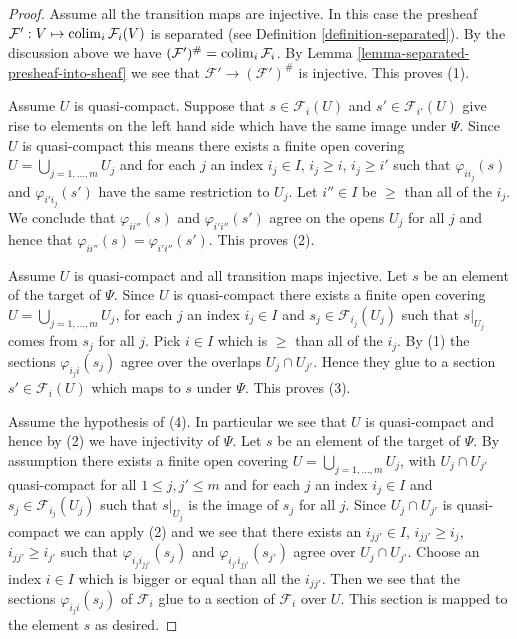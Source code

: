 \begin{proof}
Assume all the transition maps are injective. In this case the presheaf
$\mathcal{F}' : V \mapsto \mathop{\mathrm{colim}}\nolimits_i \mathcal{F}_i(V)$ is
separated (see Definition \ref{definition-separated}).
By the discussion above we have
$(\mathcal{F}')^\# = \mathop{\mathrm{colim}}\nolimits_i \mathcal{F}_i$.
By Lemma \ref{lemma-separated-presheaf-into-sheaf} we see that
$\mathcal{F}' \to (\mathcal{F}')^\#$ is injective. This proves (1).

\medskip\noindent
Assume $U$ is quasi-compact.
Suppose that $s \in \mathcal{F}_i(U)$ and
$s' \in \mathcal{F}_{i'}(U)$ give rise to elements on
the left hand side which have the same image under $\Psi$.
Since $U$ is quasi-compact this means there exists
a finite open covering $U = \bigcup_{j = 1, \ldots, m} U_j$
and for each $j$ an index $i_j \in I$, $i_j \geq i$, $i_j \geq i'$
such that $\varphi_{ii_j}(s)$ and $\varphi_{i'i_j}(s')$ have the
same restriction to $U_j$.
Let $i''\in I$ be $\geq$ than all of the $i_j$.
We conclude that $\varphi_{ii''}(s)$ and $\varphi_{i'i''}(s')$
agree on the opens $U_j$ for all $j$ and hence that
$\varphi_{ii''}(s) = \varphi_{i'i''}(s')$. This proves (2).

\medskip\noindent
Assume $U$ is quasi-compact and all transition maps injective.
Let $s$ be an element of the target of $\Psi$.
Since $U$ is quasi-compact
there exists a finite open covering $U = \bigcup_{j = 1, \ldots, m} U_j$,
for each $j$ an index $i_j \in I$ and $s_j \in \mathcal{F}_{i_j}(U_j)$
such that $s|_{U_j}$ comes from $s_j$ for all $j$.
Pick $i \in I$ which is $\geq$ than all of the $i_j$.
By (1) the sections $\varphi_{i_ji}(s_j)$ agree over the
overlaps $U_j \cap U_{j'}$. Hence they glue to a section
$s' \in \mathcal{F}_i(U)$ which maps to $s$ under $\Psi$.
This proves (3).

\medskip\noindent
Assume the hypothesis of (4). In particular we see that
$U$ is quasi-compact and hence by (2) we have injectivity of $\Psi$.
Let $s$ be an element of the target of $\Psi$.
By assumption there  exists a finite open covering
$U = \bigcup_{j = 1, \ldots, m} U_j$, with $U_j \cap U_{j'}$
quasi-compact for all $1 \leq j, j' \leq m$ and
for each $j$ an index $i_j \in I$ and $s_j \in \mathcal{F}_{i_j}(U_j)$
such that $s|_{U_j}$ is the image of $s_j$ for all $j$.
Since $U_j \cap U_{j'}$ is quasi-compact we can apply (2)
and we see that there exists an $i_{jj'} \in I$,
$i_{jj'} \geq i_j$, $i_{jj'} \geq i_{j'}$ such that
$\varphi_{i_ji_{jj'}}(s_j)$ and $\varphi_{i_{j'}i_{jj'}}(s_{j'})$
agree over $U_j \cap U_{j'}$. Choose an index $i \in I$
which is bigger or equal than all the $i_{jj'}$. Then we see that
the sections $\varphi_{i_ji}(s_j)$ of $\mathcal{F}_i$ glue
to a section of $\mathcal{F}_i$ over $U$. This section is mapped
to the element $s$ as desired.
\end{proof}


